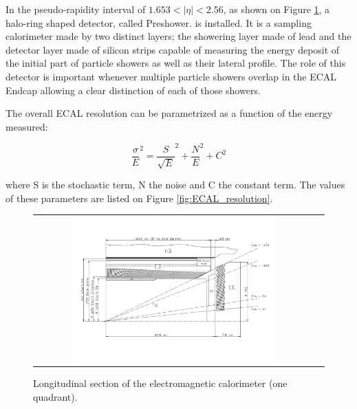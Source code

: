 In the pseudo-rapidity interval of $1.653 < |\eta| < 2.56$, as shown on Figure \ref{fig:ECAL_section}, a halo-ring shaped detector, called Preshower. is installed. It is a sampling calorimeter made by two distinct layers; the showering layer made of lead and the detector layer made of silicon strips capable of measuring the energy deposit of the initial part of particle showers as well as their lateral profile. The role of this detector is important whenever multiple particle showers overlap in the ECAL Endcap allowing a clear distinction of each of those showers.

The overall ECAL resolution can be parametrized as a function of the energy measured:

\begin{equation}
\dfrac{\sigma}{E}^{2} = \dfrac{S}{\sqrt{E}}^{2} + \dfrac{N}{E}^{2} + C^{2}
\end{equation}

where S is the stochastic term, N the noise and C the constant term. The values of these
parameters are listed on Figure \ref{fig:ECAL_resolution}.  

\begin{figure}[tbh!]
	\centering
	\begin{tabular}{cc}
		\includegraphics[width=0.75\textwidth]{detector/pics/ECAL_section.pdf}
	\end{tabular}
	\caption{Longitudinal section of the electromagnetic calorimeter (one quadrant).}
	\label{fig:ECAL_section}
\end{figure}

